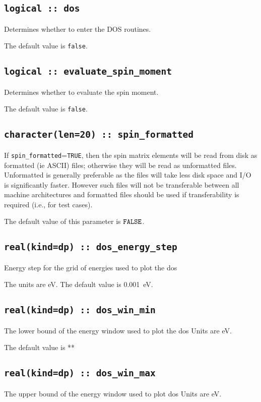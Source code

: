 \subsection[dos]{\tt logical :: dos}
Determines whether to enter the DOS routines.

The default value is \verb#false#.


\subsection[evaluate\_spin\_moment]{\tt logical :: evaluate\_spin\_moment}
Determines whether to evaluate the spin moment.

The default value is \verb#false#.

\subsection[spin\_formated]{\tt character(len=20) :: spin\_formatted}

If \verb#spin_formatted#=\verb#TRUE#, then the spin matrix elements will be
read from disk as formatted (ie ASCII) files; otherwise they will be
read as unformatted files. Unformatted is generally preferable as the
files will take less disk space and I/O is significantly
faster. However such files will not be transferable between all
machine architectures and formatted files should be used if
transferability is required (i.e., for test cases).

The default value of this parameter is $\verb#FALSE#$.

\subsection[berry\_energy\_step]{\tt real(kind=dp) :: dos\_energy\_step}
Energy step for the grid of energies used to plot the dos

The units are eV.
The default value is 0.001~eV.

\subsection[dos\_win\_min]{\tt real(kind=dp) :: dos\_win\_min}
The lower bound of the energy window  used to plot the dos
Units are eV.

The default value is **

\subsection[dos\_win\_max]{\tt real(kind=dp) :: dos\_win\_max}
The upper bound of the energy window used to plot dos
Units are eV.

